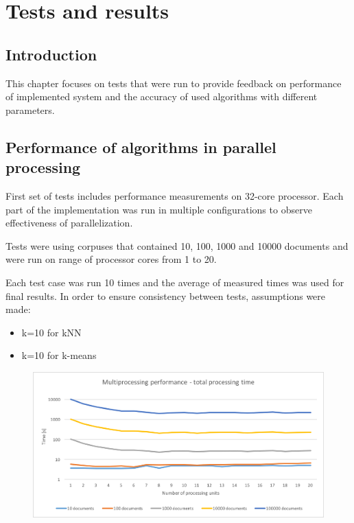 \chapter{Tests and results} \label{tests}
\section{Introduction}
This chapter focuses on tests that were run to provide feedback on performance of implemented system and the accuracy of used algorithms with different parameters. 

\section{Performance of algorithms in parallel processing} \label{parallel-performance}
First set of tests includes performance measurements on 32-core processor. Each part of the implementation was run in multiple configurations to observe effectiveness of parallelization.

Tests were using corpuses that contained 10, 100, 1000 and 10000 documents and were run on range of processor cores from 1 to 20.

Each test case was run 10 times and the average of measured times was used for final results. In order to ensure consistency between tests, assumptions were made:
\begin{itemize}
	\item k=10 for kNN
	\item k=10 for k-means
\end{itemize}

\begin{figure}[ht]
\begin{center}
 \includegraphics[width=0.9\linewidth]{images/tests/mp-total-sum.png}
 \caption{ }
 \label{mp-total-sum}
 \end{center}
 \end{figure}
 
